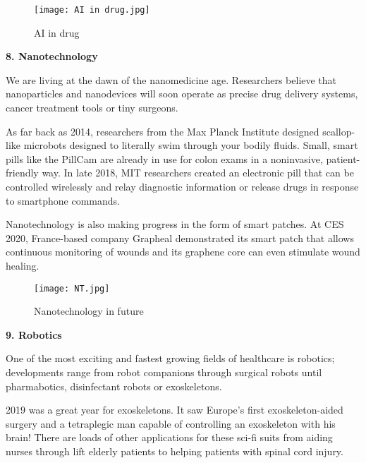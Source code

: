\documentclass[12pt,a4paper]{article}
\begin{document}
\hspace{5cm}

\begin{figure}[h]
\centering
\texttt{[image: AI in drug.jpg]}
\caption{AI in drug}
\end{figure}

\clearpage

\textbf{8. Nanotechnology}


\hspace{1cm}

We are living at the dawn of the nanomedicine age. Researchers believe that nanoparticles and nanodevices will soon operate as precise drug delivery systems, cancer treatment tools or tiny surgeons.

As far back as 2014, researchers from the Max Planck Institute designed scallop-like microbots designed to literally swim through your bodily fluids. Small, smart pills like the PillCam are already in use for colon exams in a noninvasive, patient-friendly way. In late 2018, MIT researchers created an electronic pill that can be controlled wirelessly and relay diagnostic information or release drugs in response to smartphone commands.


Nanotechnology is also making progress in the form of smart patches. At CES 2020, France-based company Grapheal demonstrated its smart patch that allows continuous monitoring of wounds and its graphene core can even stimulate wound healing. 

\hspace{5cm}

\begin{figure}[h]
\centering
\texttt{[image: NT.jpg]}
\caption{Nanotechnology in future}
\end{figure}


\clearpage


\textbf{9. Robotics}


\hspace{1cm}



One of the most exciting and fastest growing fields of healthcare is robotics; developments range from robot companions through surgical robots until pharmabotics, disinfectant robots or exoskeletons. 

2019 was a great year for exoskeletons. It saw Europe’s first exoskeleton-aided surgery and a tetraplegic man capable of controlling an exoskeleton with his brain! There are loads of other applications for these sci-fi suits from aiding nurses through lift elderly patients to helping patients with spinal cord injury.
\end{document}
